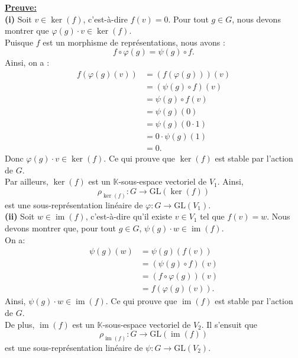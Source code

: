 \documentclass[a4paper, 14pt]{report}
\begin{document}
\begin{onehalfspace}
{			
			
			\textbf{\underline{Preuve:}}\\
			\textbf{(i)} Soit \( v \in \ker(f) \), c’est-à-dire \( f(v) = 0 \). Pour tout \( g \in G \), nous devons montrer que \( \varphi(g) \cdot v \in \ker(f) \).\\
			Puisque \( f \) est un morphisme de représentations, nous avons :  
			\[
			f \circ \varphi(g) = \psi(g) \circ f.
			\]
			Ainsi, on a :  
			\[
			\begin{aligned}
				f(\varphi(g)(v)) &= (f(\varphi(g)))(v) \\
				&= (\psi(g) \circ f)(v) \\
				&= \psi(g) \circ f(v) \\
				&= \psi(g)(0) \\
				&= \psi(g)(0 \cdot 1) \\
				&= 0 \cdot \psi(g)(1) \\
				&= 0.
			\end{aligned}
			\]
			Donc \( \varphi(g) \cdot v \in \ker(f) \). Ce qui prouve que \( \ker(f) \) est stable par l’action de \( G \).\\
			Par ailleurs, \( \ker(f) \) est un \( \mathbb{K} \)-sous-espace vectoriel de \( V_1 \). Ainsi, 
			\[ \rho_{\ker(f)} : G \to \mathrm{GL}(\ker(f))\]  
			est une sous-représentation linéaire de \( \varphi : G \to \mathrm{GL}(V_1) \).\\
			\textbf{(ii)} Soit \( w \in \operatorname{im}(f) \), c’est-à-dire qu’il existe \( v \in V_1 \) tel que \( f(v) = w \). Nous devons montrer que, pour tout \( g \in G \), \( \psi(g) \cdot w \in \operatorname{im}(f) \).  \\
			On a:  
			\[
			\begin{aligned}
				\psi(g)(w) &= \psi(g)(f(v)) \\
				&= (\psi(g) \circ f)(v) \\
				&= (f \circ \varphi(g))(v) \\
				&= f(\varphi(g)(v)).
			\end{aligned}
			\]
			Ainsi, \( \psi(g) \cdot w \in \operatorname{im}(f) \). Ce qui prouve que \( \operatorname{im}(f) \) est stable par l’action de \( G \).\\  
			De plus, \( \operatorname{im}(f) \) est un \( \mathbb{K} \)-sous-espace vectoriel de \( V_2 \). Il s’ensuit que
			\[\rho_{\operatorname{im}(f)} : G \to \mathrm{GL}(\operatorname{im}(f))\]
			est une sous-représentation linéaire de  
			\( \psi : G \to \mathrm{GL}(V_2) \).\\	
			
}
\end{onehalfspace}
\end{document}
